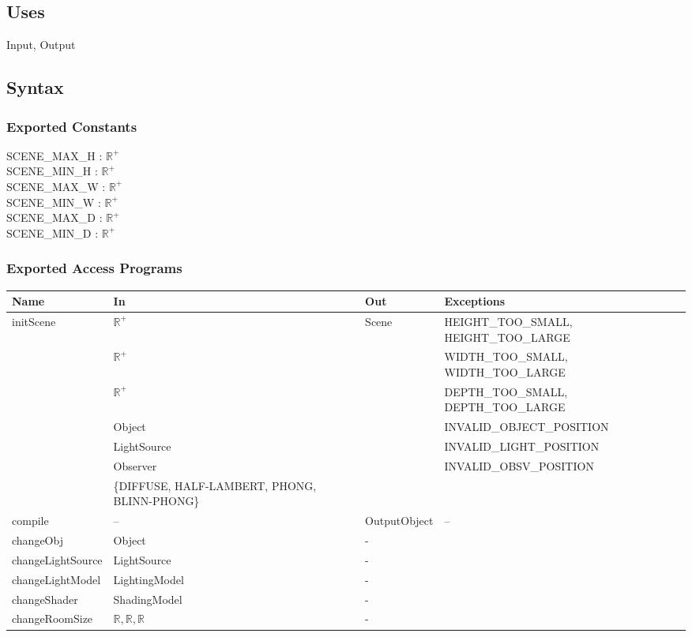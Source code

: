 \documentclass[12pt, titlepage]{article}
\begin{document}
\subsection{Uses}
Input, Output

\subsection{Syntax}
\subsubsection{Exported Constants}
SCENE\_MAX\_H : $\mathbb{R}^+$\\
SCENE\_MIN\_H : $\mathbb{R}^+$\\
SCENE\_MAX\_W : $\mathbb{R}^+$\\
SCENE\_MIN\_W : $\mathbb{R}^+$\\
SCENE\_MAX\_D : $\mathbb{R}^+$\\
SCENE\_MIN\_D : $\mathbb{R}^+$\\
\subsubsection{Exported Access Programs}
\begin{center}
	\begin{tabular}{p{2cm} p{4cm} p{2cm} p{4cm}}
		\hline
		\textbf{Name} & \textbf{In} & \textbf{Out} & \textbf{Exceptions} \\
		\hline
		\multirow{7}{4cm}{initScene} & $\mathbb{R}^+$ & Scene & 
		HEIGHT\_TOO\_SMALL, 
		HEIGHT\_TOO\_LARGE\\
		& $\mathbb{R}^+$ & & WIDTH\_TOO\_SMALL, 
		WIDTH\_TOO\_LARGE\\		
		& $\mathbb{R}^+$ & & DEPTH\_TOO\_SMALL, 
		DEPTH\_TOO\_LARGE\\				 
		& Object & & INVALID\_OBJECT\_POSITION\\				 
		& LightSource & & INVALID\_LIGHT\_POSITION\\
		& Observer & & INVALID\_OBSV\_POSITION\\
		& \{DIFFUSE, HALF-LAMBERT, PHONG, BLINN-PHONG\} & & \\
		compile & -- & OutputObject & -- \\
		\hline
		changeObj & Object & - & \\
		changeLightSource & LightSource & - & \\
		changeLightModel & LightingModel & - & \\
		changeShader & ShadingModel & - & \\
		changeRoomSize & $\mathbb{R},\mathbb{R},\mathbb{R}$ & - & \\
		
	\end{tabular}
\end{center}
\end{document}

